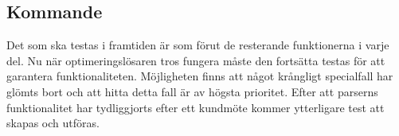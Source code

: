 \subsection{Kommande}
Det som ska testas i framtiden är som förut de resterande funktionerna i varje del. Nu när optimeringslösaren tros fungera måste den fortsätta testas för att garantera funktionaliteten. Möjligheten finns att något krångligt specialfall har glömts bort och att hitta detta fall är av högsta prioritet. \newline
Efter att parserns funktionalitet har tydliggjorts efter ett kundmöte kommer ytterligare test att skapas och utföras.